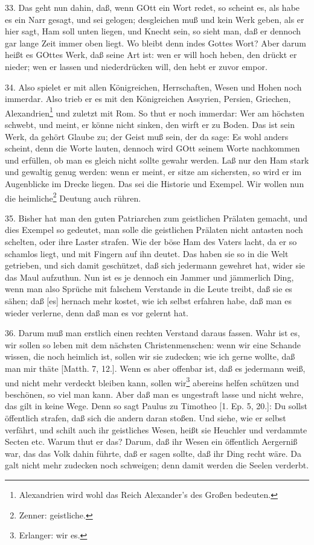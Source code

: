 33. Das geht nun dahin, daß, wenn GOtt ein Wort redet, so scheint es, als habe es ein Narr gesagt, und sei gelogen; desgleichen muß
und kein Werk geben, als er hier sagt, Ham soll unten liegen, und Knecht sein, so sieht man, daß er dennoch gar lange Zeit immer oben liegt. Wo bleibt denn indes Gottes Wort? Aber darum heißt es GOttes Werk, daß seine Art ist: wen er will hoch heben, den drückt er nieder; wen er lassen und niederdrücken will, den hebt er zuvor empor.

34. Also spielet er mit allen Königreichen, Herrschaften, Wesen und Hohen noch immerdar. Also trieb er es mit den Königreichen Assyrien, Persien, Griechen, Alexandrien\footnote{Alexandrien wird wohl das Reich Alexander's des Großen bedeuten.} und zuletzt mit Rom. So thut er noch immerdar: Wer am höchsten schwebt, und meint, er könne nicht sinken, den wirft er zu Boden. Das ist sein Werk, da gehört Glaube zu; der Geist muß sein, der da sage: Es wohl anders scheint, denn die Worte lauten, dennoch wird GOtt seinem Worte nachkommen und erfüllen, ob man es gleich nicht sollte gewahr werden. Laß nur den Ham stark und gewaltig genug werden: wenn er meint, er sitze am sichersten, so wird er im Augenblicke im Drecke liegen. Das sei die Historie und Exempel. Wir wollen nun die heimliche\footnote{Zenner: geistliche.} Deutung auch rühren.

35. Bisher hat man den guten Patriarchen zum geistlichen Prälaten gemacht, und dies Exempel so gedeutet, man solle die geistlichen Prälaten nicht antasten noch schelten, oder ihre Laster strafen. Wie der böse Ham des Vaters lacht, da er so schamlos liegt, und mit Fingern auf ihn deutet. Das haben sie so in die Welt getrieben, und sich damit geschützet, daß sich jedermann gewehret hat, wider sie das Maul aufzuthun. Nun ist es je dennoch ein Jammer und jämmerlich Ding, wenn man also Sprüche mit falschem Verstande in die Leute treibt, daß sie es sähen; daß [es] hernach mehr kostet, wie ich selbst erfahren habe, daß man es wieder verlerne, denn daß man es vor gelernt hat.

36. Darum muß man erstlich einen rechten Verstand daraus fassen. Wahr ist es, wir sollen so leben mit dem nächsten Christenmenschen: wenn wir eine Schande wissen, die noch heimlich ist, sollen wir sie zudecken; wie ich gerne wollte, daß man mir thäte [Matth. 7, 12.]. Wenn es aber offenbar ist, daß es jedermann weiß, und nicht mehr verdeckt bleiben kann, sollen wir\footnote{Erlanger: wir es.} abereins helfen schützen und beschönen, so viel man kann. Aber daß man es ungestraft lasse und nicht wehre, das gilt in keine Wege. Denn so sagt Paulus zu Timotheo [1. Ep. 5, 20.]: Du sollst öffentlich strafen, daß sich die andern daran stoßen. Und siehe, wie er selbst verfährt, und schilt auch ihr geistliches Wesen, heißt sie Heuchler und verdammte Secten etc. Warum thut er das? Darum, daß ihr Wesen ein öffentlich Aergerniß war, das das Volk dahin führte, daß er sagen sollte, daß ihr Ding recht wäre. Da galt nicht mehr zudecken noch schweigen; denn damit werden die Seelen verderbt.

